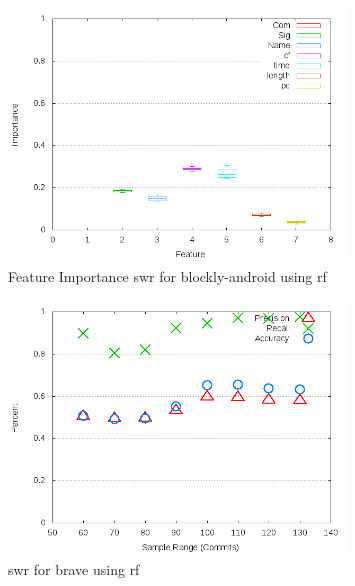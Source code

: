 \begin{figure}[!t]
\centering
\includegraphics[width=0.8\textwidth]{images/rf/test_1/blockly-android_importance.png}
\caption{Feature Importance \gls{swr} for blockly-android using \gls{rf}}
\label{fig:test_1_blockly-android_rf_importance}
\end{figure}

\begin{figure}[!t]
\centering
\includegraphics[width=0.8\textwidth]{images/rf/test_1/brave_sample_range.png}
\caption{\gls{swr} for brave using \gls{rf}}
\label{fig:test_1_brave_rf}
\end{figure}


